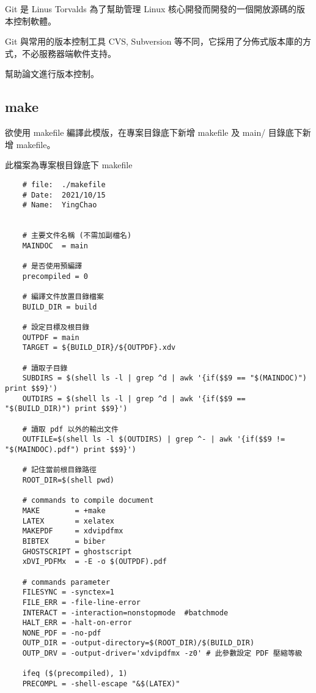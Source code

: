 Git 是 Linus Torvalds 為了幫助管理 Linux 核心開發而開發的一個開放源碼的版本控制軟體。

Git 與常用的版本控制工具 CVS, Subversion 等不同，它採用了分佈式版本庫的方式，不必服務器端軟件支持。

幫助論文進行版本控制。

\subsection{make}

欲使用 makefile 編譯此模版，在專案目錄底下新增 makefile 及 main/ 目錄底下新增 makefile。

\newpage

此檔案為專案根目錄底下 makefile

\begin{lstlisting} 
    # file:  ./makefile
    # Date:  2021/10/15
    # Name:  YingChao
    
    
    # 主要文件名稱 (不需加副檔名)
    MAINDOC  = main
    
    # 是否使用預編譯
    precompiled = 0
    
    # 編譯文件放置目錄檔案
    BUILD_DIR = build
    
    # 設定目標及根目錄
    OUTPDF = main
    TARGET = ${BUILD_DIR}/${OUTPDF}.xdv
    
    # 讀取子目錄
    SUBDIRS = $(shell ls -l | grep ^d | awk '{if($$9 == "$(MAINDOC)") print $$9}')
    OUTDIRS = $(shell ls -l | grep ^d | awk '{if($$9 == "$(BUILD_DIR)") print $$9}')
    
    # 讀取 pdf 以外的輸出文件
    OUTFILE=$(shell ls -l $(OUTDIRS) | grep ^- | awk '{if($$9 != "$(MAINDOC).pdf") print $$9}')
    
    # 記住當前根目錄路徑
    ROOT_DIR=$(shell pwd)
    
    # commands to compile document
    MAKE	    = +make
    LATEX       = xelatex
    MAKEPDF	    = xdvipdfmx
    BIBTEX	    = biber
    GHOSTSCRIPT = ghostscript
    xDVI_PDFMx  = -E -o $(OUTPDF).pdf
    
    # commands parameter
    FILESYNC = -synctex=1
    FILE_ERR = -file-line-error
    INTERACT = -interaction=nonstopmode  #batchmode
    HALT_ERR = -halt-on-error
    NONE_PDF = -no-pdf
    OUTP_DIR = -output-directory=$(ROOT_DIR)/$(BUILD_DIR)
    OUTP_DRV = -output-driver='xdvipdfmx -z0' # 此參數設定 PDF 壓縮等級
    
    ifeq ($(precompiled), 1)
    PRECOMPL = -shell-escape "&$(LATEX)"
    

\end{lstlisting}
